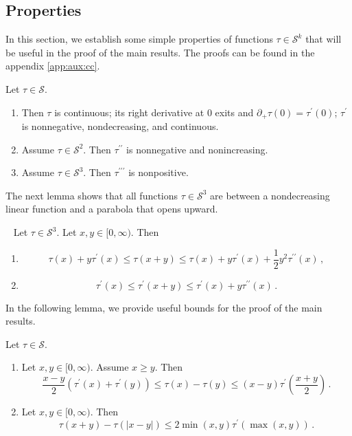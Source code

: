 \documentclass{article}
\newcommand{\lb}{\left(} %
\newcommand{\rb}{\right)} %
\newcommand{\br}[1]{\lb #1 \rb} %
\newcommand{\brOf}[1]{\!\br{#1}} %
\newcommand{\abs}[1]{\left| #1 \right|} %
\newcommand*{\mc}[1]{\mathcal{#1}}
\newcommand{\Rp}{[0, \infty)} %
\newcommand{\pr}{^\prime}
\newcommand{\prr}{^{\prime\prime}}
\newcommand{\prrr}{^{\prime\prime\prime}}
\newcommand{\equationFullstop}{\, .}
\newcommand{\eqfs}{\equationFullstop}
\newcommand{\equationComma}{\, ,}
\newcommand{\eqcm}{\equationComma}
\newcommand{\tran}{\tau}
\newcommand{\dtran}{\tran\pr}
\newcommand{\ddtran}{\tran\prr}
\newcommand{\dddtran}{\tran\prrr}
\newcommand{\setcc}{\mc S}
\newcommand{\setccd}[1]{\mc S^{#1}}
\begin{document}
\subsection{Properties}
%
In this section, we establish some simple properties of functions $\tran\in\setccd{k}$ that will be useful in the proof of the main results. The proofs can be found in the appendix \ref{app:aux:cc}.
%
\begin{lemma}\label{lmm:ccSimpleProps}
	Let $\tran\in\setcc$. 
	\begin{enumerate}[label=(\roman*)]
		\item Then $\tran$ is continuous; its right derivative at $0$ exits and $\partial_+ \tran(0) = \dtran(0)$; $\dtran$ is nonnegative, nondecreasing, and continuous.
		\item Assume $\tran\in\setccd{2}$. Then $\ddtran$ is nonnegative and nonincreasing.
		\item Assume $\tran\in\setccd{3}$. Then $\dddtran$ is nonpositive.
	\end{enumerate}
\end{lemma}
%
The next lemma shows that all functions $\tran\in\setccd3$ are between a nondecreasing linear function and a parabola that opens upward.
%
\begin{lemma}\label{lmm:ccpoly}\mbox{ }
	Let $\tran\in\setccd3$. Let $x, y \in \Rp$. Then
	\begin{enumerate}[label=(\roman*)]
		\item  \label{lmm:ccpoly:taylor} 
		\begin{equation*}
			\tran(x) + y \dtran(x) \leq \tran(x + y) \leq \tran(x) + y \dtran(x) + \frac12 y^2 \ddtran(x)
			\eqcm
		\end{equation*}
		\item \label{lmm:ccpoly:dtaylor} 
		\begin{equation*}
			\dtran(x) \leq \dtran(x + y) \leq \dtran(x) + y \ddtran(x)
			\eqfs
		\end{equation*}
	\end{enumerate}
\end{lemma}
%
In the following lemma, we provide useful bounds for the proof of the main results. 
%
\begin{lemma}\label{lmm:ccdiff}
	Let $\tran\in\setcc$.
	\begin{enumerate}[label=(\roman*)]
		\item \label{lmm:ccdiff:tight} Let $x,y\in\Rp$. Assume $x \geq y$. Then
		\begin{equation*}
			\frac{x-y}2\br{\dtran(x)+\dtran(y)} \leq \tran(x) - \tran(y) \leq (x-y)\dtran\brOf{\frac{x+y}{2}}
			\eqfs
		\end{equation*}
		\item \label{lmm:ccdiff:tightabs} Let $x,y\in\Rp$. Then
		\begin{equation*}
			\tran(x+y) - \tran(\abs{x-y}) \leq 2\min(x, y)\dtran(\max(x, y))
			\eqfs
		\end{equation*}
	\end{enumerate}
\end{lemma}
%
%
%
\end{document}
